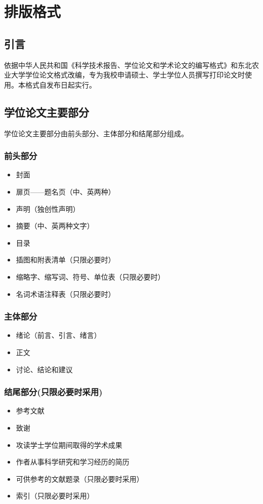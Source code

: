\chapter{排版格式}\label{chap:format}

\section{引言}
依据中华人民共和国《科学技术报告、学位论文和学术论文的编写格式》和东北农业大学学位论文格式改编，专为我校申请硕士、学士学位人员撰写打印论文时使用。本格式自发布日起实行。
\section{学位论文主要部分}
学位论文主要部分由前头部分、主体部分和结尾部分组成。
\subsection{前头部分}
\begin{itemize}
    \item 封面
    \item 扉页——题名页（中、英两种）
    \item 声明（独创性声明）
    \item 摘要（中、英两种文字）
    \item 目录
    \item 插图和附表清单（只限必要时）
    \item 缩略字、缩写词、符号、单位表（只限必要时）
    \item 名词术语注释表（只限必要时）
\end{itemize}

\subsection{主体部分}
\begin{itemize}
    \item 绪论（前言、引言、绪言）
    \item 正文
    \item 讨论、结论和建议
\end{itemize}
\subsection{结尾部分(只限必要时采用)}
\begin{itemize}
    \item 参考文献
    \item 致谢
    \item 攻读学士学位期间取得的学术成果
    \item 作者从事科学研究和学习经历的简历
    \item 可供参考的文献题录（只限必要时采用）
    \item 索引（只限必要时采用）
\end{itemize}

